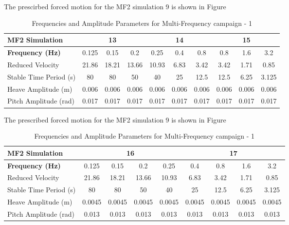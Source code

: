 \documentclass[a4paper, 12pt]{report}
\begin{document}
The prescirbed forced motion for the MF2 simulation 9 is shown in Figure



\begin{table}[htbp]
\centering
\renewcommand{\arraystretch}{1.2}
\caption{Frequencies and Amplitude Parameters for Multi-Frequency campaign - 1}
\label{tab:Frequencies and Amplitude Parameters for Multi-Frequency campaign - 1}
\begin{tabular}{|l|ccc|ccc|ccc|}
\hline
\rule{0pt}{12pt}\textbf{MF2 Simulation} & \multicolumn{3}{c|}{13} & \multicolumn{3}{c|}{14} & \multicolumn{3}{c|}{15} \\[4pt]
\hline
\rule{0pt}{12pt}\textbf{Frequency (Hz)} & 0.125 & 0.15 & 0.2 & 0.25 & 0.4 & 0.8 & 0.8 & 1.6 & 3.2 \\[4pt]
\hline
Reduced Velocity        & 21.86 & 18.21 & 13.66 & 10.93 & 6.83 & 3.42 & 3.42 & 1.71 & 0.85 \\
Stable Time Period (s)  & 80    & 80    & 50    & 40    & 25   & 12.5 & 12.5 & 6.25 & 3.125 \\
Heave Amplitude (m)     & 0.006 & 0.006 & 0.006 & 0.006 & 0.006 & 0.006 & 0.006 & 0.006 & 0.006 \\
Pitch Amplitude (rad)   & 0.017 & 0.017 & 0.017 & 0.017 & 0.017 & 0.017 & 0.017 & 0.017 & 0.017 \\
\hline
\end{tabular}
\end{table}

The prescribed forced motion for the MF2 simulation 9 is shown in Figure

\begin{table}[htbp]
\centering
\renewcommand{\arraystretch}{1.2}
\caption{Frequencies and Amplitude Parameters for Multi-Frequency campaign - 1}
\label{tab:Frequencies and Amplitude Parameters for Multi-Frequency campaign - 1}
\begin{tabular}{|l|cccc|cccc|}
\hline
\rule{0pt}{12pt}\textbf{MF2 Simulation} & \multicolumn{4}{c|}{16} & \multicolumn{4}{c|}{17} \\[4pt]
\hline
\rule{0pt}{12pt}\textbf{Frequency (Hz)} & 0.125 & 0.15 & 0.2 & 0.25 & 0.4 & 0.8 & 1.6 & 3.2 \\[4pt]
\hline
Reduced Velocity        & 21.86 & 18.21 & 13.66 & 10.93 & 6.83 & 3.42 & 1.71 & 0.85 \\
Stable Time Period (s)  & 80    & 80    & 50    & 40    & 25   & 12.5 & 6.25 & 3.125 \\
Heave Amplitude (m)     & 0.0045 & 0.0045 & 0.0045 & 0.0045 & 0.0045 & 0.0045 & 0.0045 & 0.0045 \\
Pitch Amplitude (rad)   & 0.013 & 0.013 & 0.013 & 0.013 & 0.013 & 0.013 & 0.013 & 0.013 \\
\hline
\end{tabular}
\end{table}
\end{document}
